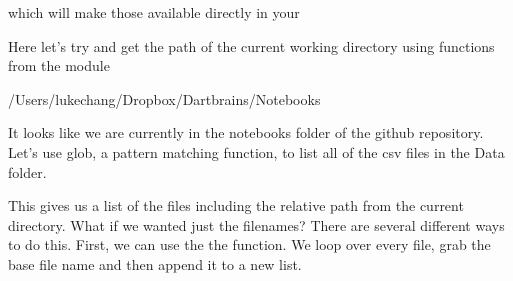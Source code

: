 \documentclass[letterpaper,10pt,english]{sphinxmanual}
\begin{document}
which will make those available directly in your 

\begin{sphinxVerbatim}[commandchars=\\\{\}]
 
   
\end{sphinxVerbatim}

Here let’s try and get the path of the current working directory using functions from the  module

\begin{sphinxVerbatim}[commandchars=\\\{\}]
\end{sphinxVerbatim}

\begin{sphinxVerbatim}[commandchars=\\\{\}]
\PYGZsq{}/Users/lukechang/Dropbox/Dartbrains/Notebooks\PYGZsq{}
\end{sphinxVerbatim}

It looks like we are currently in the notebooks folder of the github repository.  Let’s use glob, a pattern matching function, to list all of the csv files in the Data folder.

\begin{sphinxVerbatim}[commandchars=\\\{\}]
  
\end{sphinxVerbatim}

\begin{sphinxVerbatim}[commandchars=\\\{\}]
[]
\end{sphinxVerbatim}

This gives us a list of the files including the relative path from the current directory.  What if we wanted just the filenames?  There are several different ways to do this.  First, we can use the the  function.  We loop over every file, grab the base file name and then append it to a new list.
\end{document}
